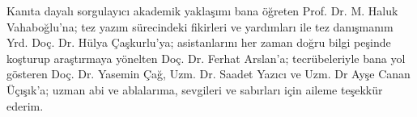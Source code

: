  Kanıta dayalı sorgulayıcı akademik yaklaşımı bana öğreten Prof. Dr. M. Haluk Vahaboğlu'na; tez yazım sürecindeki fikirleri ve yardımları ile tez danışmanım Yrd. Doç. Dr. Hülya Çaşkurlu'ya; asistanlarını her zaman doğru bilgi peşinde koşturup araştırmaya yönelten Doç. Dr. Ferhat Arslan'a; tecrübeleriyle bana yol gösteren Doç. Dr. Yasemin Çağ, Uzm. Dr. Saadet Yazıcı ve Uzm. Dr Ayşe Canan Üçışık'a; uzman abi ve  ablalarıma, sevgileri ve sabırları için aileme teşekkür ederim.


\bigskip
\hfill {\Fontlukas \authornames}\\
\smallskip
\hfill {\texttt{\href{mailto:\email}{\email}}}

 \cleardoublepage
 
